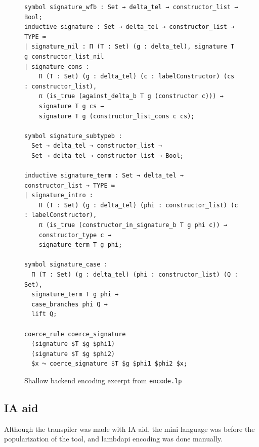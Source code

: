 \documentclass[a4paper, anonymous, UKenglish,cleveref, autoref, thm-restate]{lipics-v2021}
\begin{document}
\begin{figure}[!ht]
\begin{lstlisting}[language=Lambdapi, basicstyle={\ttfamily\scriptsize\upshape}, inputencoding=utf8, extendedchars=true]
symbol signature_wfb : Set → delta_tel → constructor_list → Bool;
inductive signature : Set → delta_tel → constructor_list → TYPE ≔
| signature_nil : Π (T : Set) (g : delta_tel), signature T g constructor_list_nil
| signature_cons :
    Π (T : Set) (g : delta_tel) (c : labelConstructor) (cs : constructor_list),
    π (is_true (against_delta_b T g (constructor c))) →
    signature T g cs →
    signature T g (constructor_list_cons c cs);

symbol signature_subtypeb :
  Set → delta_tel → constructor_list →
  Set → delta_tel → constructor_list → Bool;
  
inductive signature_term : Set → delta_tel → constructor_list → TYPE ≔
| signature_intro :
    Π (T : Set) (g : delta_tel) (phi : constructor_list) (c : labelConstructor),
    π (is_true (constructor_in_signature_b T g phi c)) →
    constructor_type c →
    signature_term T g phi;

symbol signature_case :
  Π (T : Set) (g : delta_tel) (phi : constructor_list) (Q : Set),
  signature_term T g phi →
  case_branches phi Q →
  lift Q;

coerce_rule coerce_signature
  (signature $T $g $phi1)
  (signature $T $g $phi2)
  $x ↪ coerce_signature $T $g $phi1 $phi2 $x;
\end{lstlisting}
\caption{Shallow backend encoding excerpt from \texttt{encode.lp}}
\label{fig:encode-shallow}
\end{figure}

\subsection{IA aid}
Although the transpiler was made with IA aid, the mini language was before the popularization of the tool, and lambdapi encoding was done manually.


\end{document}
